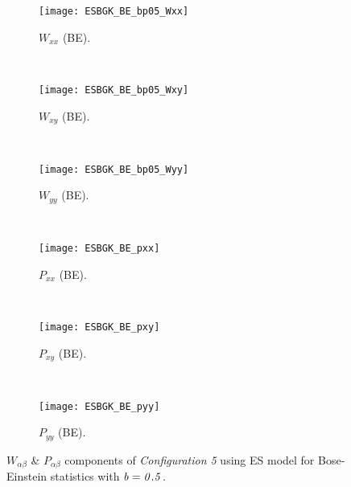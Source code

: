 \documentclass{rsproca}%
\begin{document}
\begin{figure}
        \centering
        \begin{subfigure}[b]{0.32\textwidth}
                \centering
                \texttt{[image: ESBGK\_BE\_bp05\_Wxx]}
                \caption{$W_{xx}$ (BE).}
                \label{fig:5ESBGK_BE_bp05_Wxx}
        \end{subfigure}%
        ~ %
        \begin{subfigure}[b]{0.32\textwidth}
                \centering
                \texttt{[image: ESBGK\_BE\_bp05\_Wxy]}
                \caption{$W_{xy}$ (BE).}
                \label{fig:5ESBGK_BE_bp05_Wxy}
        \end{subfigure}
        ~ %
        \begin{subfigure}[b]{0.32\textwidth}
                \centering
                \texttt{[image: ESBGK\_BE\_bp05\_Wyy]}
                \caption{$W_{yy}$ (BE).}
                \label{fig:5ESBGK_BE_bp05_Wyy}
        \end{subfigure}
				~ %
				\begin{subfigure}[b]{0.32\textwidth}
                \centering
                \texttt{[image: ESBGK\_BE\_pxx]}
                \caption{$P_{xx}$ (BE).}
                \label{fig:ESBGK_BE_pxx}
        \end{subfigure}%
        ~ %
        \begin{subfigure}[b]{0.32\textwidth}
                \centering
                \texttt{[image: ESBGK\_BE\_pxy]}
                \caption{$P_{xy}$ (BE).}
                \label{fig:ESBGK_BE_pxy}
        \end{subfigure}
        ~ %
        \begin{subfigure}[b]{0.32\textwidth}
                \centering
                \texttt{[image: ESBGK\_BE\_pyy]}
                \caption{$P_{yy}$ (BE).}
                \label{fig:ESBGK_BE_pyy}
        \end{subfigure}
        \caption{$W_{\alpha \beta}$ \& $P_{\alpha \beta}$ components of \emph{Configuration 5} using ES model for Bose-Einstein statistics with $\it{b=0.5}$.}
				\label{fig:conf5_W_p_Tensor}
\end{figure}
\end{document}
